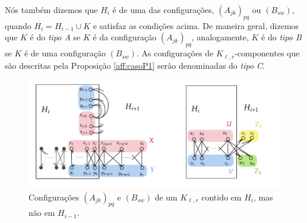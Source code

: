 \documentclass[12pt,a4paper]{book}
\newcommand{\K}{K_{\ell,r}} %
\begin{document}
    Nós também dizemos que $H_i$ é de uma das configurações, $(A_{jk})_{pq}$ ou $(B_{sw})$, 
    quando $H_i = H_{i-1} \cup K$ e satisfaz as condições acima. 
	De maneira geral, dizemos que $K$ é do \textit{tipo A} se $K$ é da configuração $(A_{jk})_{pq}$, analogamente,
		$K$ é do \textit{tipo B} se $K$ é de uma configuração $(B_{sw})$.
    As configurações de $\K$-componentes que são descritas pela Proposição \ref{aff:casoP1} serão denominadas do \textit{tipo C}.
  
  \begin{figure}[htb] \centering \includegraphics[]{configAB_KLL.pdf}
   \caption{Configurações $(A_{jk})_{pq}$ e $(B_{sw})$ de um $\K$ contido em $H_i$, mas não em $H_{i-1}$.}
   \label{fig:configKLL}
 \end{figure}
 
\end{document}

